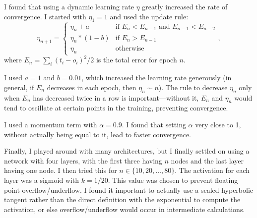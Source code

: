 \documentclass[12pt]{article}
\begin{document}
I found that using a dynamic learning rate $\eta$ greatly increased the rate of convergence.  I started with $\eta_1 = 1$ and used the update rule:
\begin{equation}
\eta_{n+1} =
\begin{cases}
   \eta_n + a & \text{if } E_n < E_{n - 1} \text{ and } E_{n - 1} < E_{n - 2} \\
   \eta_n*(1 - b) & \text{if }E_n > E_{n - 1} \\
   \eta_n & \text{otherwise}
\end{cases},
\end{equation}
where $E_n=\sum_i{(t_i - o_i)^2}/2$ is the total error for epoch $n$.

I used $a = 1$ and $b = 0.01$, which increased the learning rate generously (in general, if $E_n$ decreases in each epoch, then $\eta_n \sim n$).  The rule to decrease $\eta_n$ only when $E_n$ has decreased twice in a row is important---without it, $E_n$ and $\eta_n$ would tend to oscillate at certain points in the training, preventing convergence.

I used a momentum term with $\alpha = 0.9$.  I found that setting $\alpha$ very close to 1, without actually being equal to it, lead to faster convergence.

Finally, I played around with many architectures, but I finally settled on using a network with four layers, with the first three having $n$ nodes and the last layer having one node.  I then tried this for $n\in \{10, 20, \ldots, 80\}$.  The activation for each layer was a sigmoid with $k=1/20$.  This value was chosen to prevent floating point overflow/underflow.  I found it important to actually use a scaled hyperbolic tangent rather than the direct definition with the exponential to compute the activation, or else overflow/underflow would occur in intermediate calculations.
\end{document}
